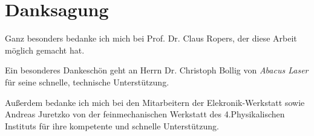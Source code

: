 \documentclass[bachelor,       %
               twoside,        %
               BCOR10mm,       %
               liststotoc,nomtotoc,bibtotoc, %
               english,ngerman, %
               final,          %
               ]{GAUBM}
\begin{document}
\chapter*{Danksagung}
Ganz besonders bedanke ich mich bei Prof. Dr. Claus Ropers, der diese Arbeit möglich gemacht hat.

Ein besonderes Dankeschön geht an Herrn Dr. Christoph Bollig von \textit{Abacus Laser} für seine schnelle, technische Unterstützung.

Außerdem bedanke ich mich bei den Mitarbeitern der Elekronik-Werkstatt sowie Andreas Juretzko von der feinmechanischen Werkstatt des 4.Physikalischen Instituts für ihre kompetente und schnelle Unterstützung.

\cleardoublepage
\Declaration
\end{document}
